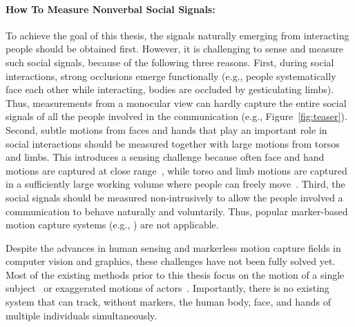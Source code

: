 \paragraph{How To Measure Nonverbal Social Signals:}
To achieve the goal of this thesis, the signals naturally emerging from interacting people should be obtained first. However, it is challenging to sense and measure such social signals, because of the following three reasons. First, during social interactions, strong occlusions emerge functionally (e.g., people systematically face each other while interacting, bodies are occluded by gesticulating limbs). Thus, measurements from a monocular view can hardly capture the entire social signals of all the people involved in the communication (e.g., Figure~\ref{fig:teaser}). Second, subtle motions from faces and hands that play an important role in social interactions should be measured together with large motions from torsos and limbs. This introduces a sensing challenge because often face and hand motions are captured at close range~\cite{beeler2010high,ghosh2011multiview, Beeler2011, bradley2010high, valgaerts2012lightweight, Oikonomidis-12, Tompson-14a, Sridha-15, Tzionas-16}, while torso and limb motions are captured in a sufficiently large working volume where people can freely move~\cite{deAguiar-2008, Gall-09, Stoll-11, Elhayek-15}. Third, the social signals should be measured non-intrusively to allow the people involved a communication to behave naturally and voluntarily. Thus, popular marker-based motion capture systems (e.g., \cite{VICON}) are not applicable. 

Despite the advances in human sensing and markerless motion capture fields in computer vision and graphics, these challenges have not been fully solved yet. Most of the existing methods prior to this thesis focus on the motion of a single subject~\cite{deAguiar-2008,Vlasic-2009,Furukawa2008,Gall-09, Stoll-11, Baak-13,Shotton-13} or exaggerated motions of actors~\cite{Ye-2012,Liu-2013}. Importantly, there is no existing system that can track, without markers, the human body, face, and hands of multiple individuals simultaneously.

